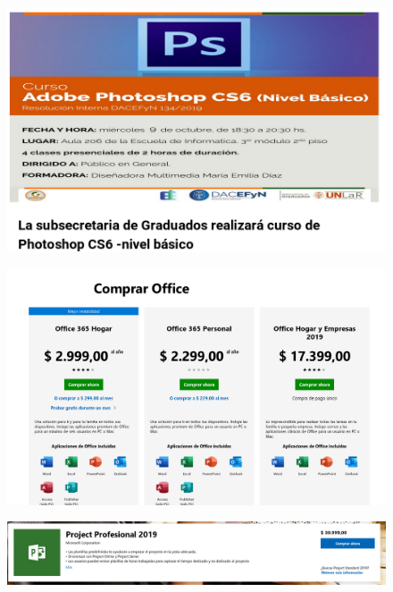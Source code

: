 \documentclass{fancyslides}
\begin{document}
\begin{frame}
\begin{figure}
	\centering
	\includegraphics[width=1\linewidth]{images/excel4}
	\caption{}
	\label{fig:excel4}
\end{figure}
\end{frame}

\begin{frame}
	\begin{figure}
		\centering
		\includegraphics[width=1\linewidth]{images/precio_ms_office}
		\caption{}
		\label{fig:preciomsoffice}
	\end{figure}
\end{frame}

\begin{frame}
	\begin{figure}
		\centering
		\includegraphics[width=1\linewidth]{images/precio_ms_project}
		\caption{}
		\label{fig:preciomsproject}
	\end{figure}
	
\end{frame}
\end{document}
